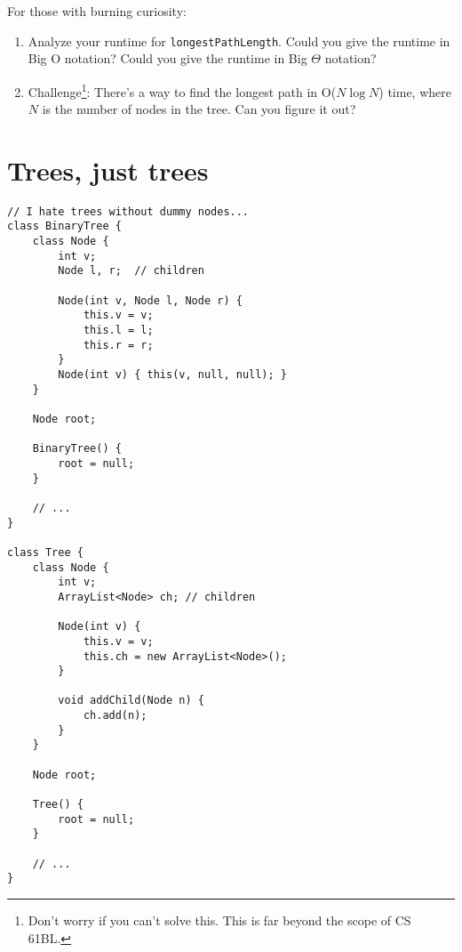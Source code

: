 \documentclass{article}
\begin{document}
For those with burning curiosity:
\begin{enumerate}
    \item Analyze your runtime for \verb|longestPathLength|.  Could you give the runtime in Big O notation?  Could you give the runtime in Big $\Theta$ notation?
    \item Challenge\footnote{Don't worry if you can't solve this.  This is far beyond the scope of CS 61BL.}: There's a way to find the longest path in O($N \log N$) time, where $N$ is the number of nodes in the tree.  Can you figure it out?
\end{enumerate}


\section{Trees, just trees}
\begin{verbatim}
// I hate trees without dummy nodes...
class BinaryTree {
    class Node {
        int v;
        Node l, r;  // children

        Node(int v, Node l, Node r) {
            this.v = v;
            this.l = l;
            this.r = r;
        }
        Node(int v) { this(v, null, null); }
    }

    Node root;

    BinaryTree() {
        root = null;
    }

    // ...
}

class Tree {
    class Node {
        int v;
        ArrayList<Node> ch; // children

        Node(int v) {
            this.v = v;
            this.ch = new ArrayList<Node>();
        }

        void addChild(Node n) {
            ch.add(n);
        }
    }

    Node root;

    Tree() {
        root = null;
    }

    // ...
}
\end{verbatim}
\end{document}

